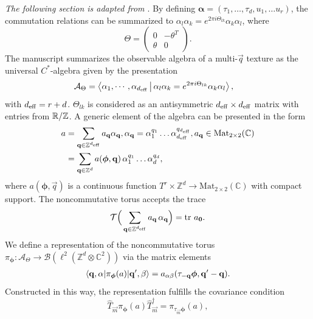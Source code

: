 \documentclass[
    10pt,
    aps,
    prb,
    twocolumn,
    floatfix,
    superscriptaddress,
]{revtex4-2}
\begin{document}
{\it The following section is adapted from \cite{Liu2022}}. By defining $\boldsymbol{\alpha}=(\tau_1, \ldots, \tau_d, u_1,\ldots u_r )$, the commutation relations can be summarized to $\alpha_l \alpha_k = e^{2 \pi i \Theta_{lk}} \alpha_k  \alpha_l$, where
\begin{equation}
    \Theta = \begin{pmatrix}
    0 & -\theta^T \\
    \theta & 0
    \end{pmatrix} .
\end{equation}
The manuscript summarizes the observable algebra of a multi-$\vec{q}$ texture as the universal $C^\ast$-algebra given by the presentation
\begin{align}
    \mathcal{A}_\Theta &= \Braket{ \alpha_1, \cdots, \alpha_{{d_\mathrm{eff}}}
    |  \alpha_l \alpha_k = e^{ 2 \pi i \Theta_{lk}} \alpha_k  \alpha_l },
\end{align}
with ${d_\mathrm{eff}} = r+ d$.
$ \Theta_{lk}$ is considered as an antisymmetric  ${d_\mathrm{eff}}\times {d_\mathrm{eff}}$  matrix with entries from ${\mathbb R}/{\mathbb Z}$.
A generic element of the algebra can be presented in the form
\begin{align}
a & = \sum_{\mathbf{q} \in {\mathbb Z}^{{d_\mathrm{eff}}}} a_{\mathbf{q}}
 \alpha_{\mathbf{q}},  \alpha_{\mathbf{q}} =\alpha_1^{q_1} \ldots\alpha_{d_\mathrm{eff}}^{q_{d_\mathrm{eff}}},  a_{\mathbf{q}} \in \mathrm{Mat}_{2\times2} (\mathbb{C})
\notag \\
& = 	\sum_{\mathbf{q} \in {\mathbb Z}^{d}} a( \boldsymbol{\phi}, \mathbf{q}) 
\, 
\alpha_1^{q_1} \ldots\alpha_d^{q_d},
\end{align}
where $ a(\boldsymbol{\phi},\vec{q}) $  is a continuous function $T^r \times \mathbb{Z}^d \to \mathrm{Mat}_{2\times 2}(\mathbb{C})$ with compact support.
The noncommutative torus accepts the trace
\begin{equation}
	\mathcal{T} \Big(
		\sum_{\mathbf{q} \in {\mathbb Z}^{{d_\mathrm{eff}}}} a_{\mathbf{q}}
\, \alpha_{\mathbf{q}}
	\Big)
	= \mathrm{tr}~ a_{\mathbf{0}} .
\end{equation}
We define a representation of the noncommutative torus $\pi_{\boldsymbol{\phi}} \colon \mathcal{A}_\Theta \to \mathcal{B}(\ell^2(\mathbb{Z}^d \otimes \mathbb{C}^2))$ via the matrix elements
\begin{align}
	\braket{\mathbf{q}, \alpha
	|
	\pi_{\boldsymbol{\phi}} (a)
	| \mathbf{q}', \beta
	}
	=
	a_{\alpha \beta} ( \tau_{-\mathbf{q}} \boldsymbol{\phi}, \mathbf{q}'-\mathbf{q}) .
\end{align}
Constructed in this way, the representation fulfills the covariance condition
\begin{equation}
	\hat{T}_{\vec{m}}
	\pi_{\boldsymbol{\phi}} (a)
	\hat{T}_{\vec{m}}^\dagger
	= \pi_{\tau_{\vec{m}}\boldsymbol{\phi}} (a) ,
\end{equation}
\end{document}
